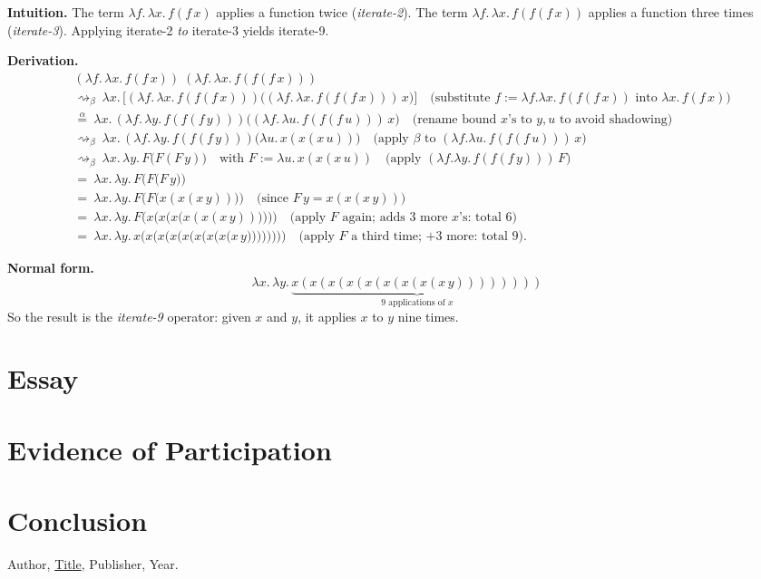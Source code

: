 \documentclass{article}
\theoremstyle{theorem}
\theoremstyle{definition}
\theoremstyle{remark}
\begin{document}
\noindent\textbf{Intuition.}
The term $\lambda f.\,\lambda x.\,f(f\,x)$ applies a function twice (\emph{iterate-2}).  
The term $\lambda f.\,\lambda x.\,f(f(f\,x))$ applies a function three times (\emph{iterate-3}).  
Applying iterate-2 \emph{to} iterate-3 yields iterate-9.

\noindent\textbf{Derivation.}
\begin{align*}
&(\lambda f.\,\lambda x.\,f(f\,x))\;(\lambda f.\,\lambda x.\,f(f(f\,x)))\\[2pt]
&\rightsquigarrow_\beta\ \lambda x.\, \big[(\lambda f.\,\lambda x.\,f(f(f\,x)))\big((\lambda f.\,\lambda x.\,f(f(f\,x)))\,x\big)\big]
\quad\text{(substitute $f := \lambda f.\lambda x.\,f(f(f\,x))$ into $\lambda x.\,f(f\,x)$)}\\[4pt]
&\overset{\alpha}{=}\ \lambda x.\, (\lambda f.\,\lambda y.\,f(f(f\,y)))\Big((\lambda f.\,\lambda u.\,f(f(f\,u)))\,x\Big)
\quad\text{(rename bound $x$'s to $y,u$ to avoid shadowing)}\\[4pt]
&\rightsquigarrow_\beta\ \lambda x.\, (\lambda f.\,\lambda y.\,f(f(f\,y)))\big(\lambda u.\,x(x(x\,u))\big)
\quad\text{(apply $\beta$ to $(\lambda f.\lambda u.\,f(f(f\,u)))\,x$)}\\[4pt]
&\rightsquigarrow_\beta\ \lambda x.\,\lambda y.\,F\big(F(F\,y)\big)
\quad\text{with }F:=\lambda u.\,x(x(x\,u))
\quad\text{(apply $(\lambda f.\lambda y.\,f(f(f\,y)))\,F$)}\\[4pt]
&=\ \lambda x.\,\lambda y.\,F\Big(F\big(F\,y\big)\Big)\\[2pt]
&=\ \lambda x.\,\lambda y.\,F\Big(F\big(x(x(x\,y))\big)\Big)
\quad\text{(since $F\,y = x(x(x\,y))$)}\\[2pt]
&=\ \lambda x.\,\lambda y.\,F\Big(x\big(x\big(x\big(x(x(x\,y))\big)\big)\big)\Big)
\quad\text{(apply $F$ again; adds $3$ more $x$'s: total $6$)}\\[2pt]
&=\ \lambda x.\,\lambda y.\,x\big(x\big(x\big(x\big(x\big(x\big(x\big(x\big(x\,y\big)\big)\big)\big)\big)\big)\big)\big)
\quad\text{(apply $F$ a third time; +3 more: total $9$)}.
\end{align*}

\noindent\textbf{Normal form.}
\[
\boxed{\ \lambda x.\,\lambda y.\,\underbrace{x(x(x(x(x(x(x(x(x\,y))))))))}_{\text{$9$ applications of }x}\ }
\]
So the result is the \emph{iterate-9} operator: given $x$ and $y$, it applies $x$ to $y$ nine times.


\section{Essay}

\section{Evidence of Participation}

\section{Conclusion}\label{conclusion}

\begin{thebibliography}{99}
 Author, \href{https://en.wikipedia.org/wiki/LaTeX}{Title}, Publisher, Year.
\end{thebibliography}
\end{document}
